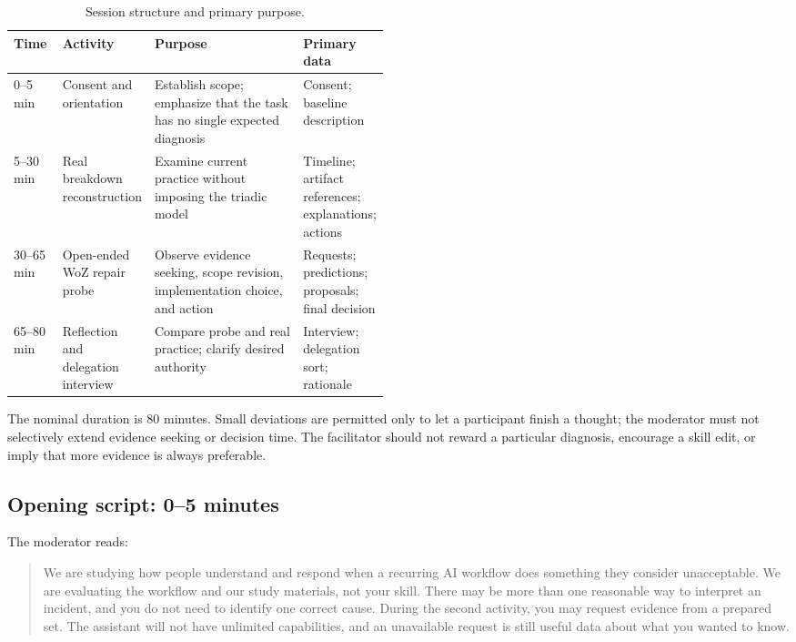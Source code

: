 \begin{table}[h]
\centering
\caption{Session structure and primary purpose.}
\label{tab:session-overview}
\begin{tabularx}{\linewidth}{P{0.13\linewidth}P{0.17\linewidth}Y P{0.18\linewidth}}
\toprule
\textbf{Time} & \textbf{Activity} & \textbf{Purpose} & \textbf{Primary data} \\
--5 min & Consent and orientation & Establish scope; emphasize that the task has no single expected diagnosis & Consent; baseline description \\
5--30 min & Real breakdown reconstruction & Examine current practice without imposing the triadic model & Timeline; artifact references; explanations; actions \\
30--65 min & Open-ended WoZ repair probe & Observe evidence seeking, scope revision, implementation choice, and action & Requests; predictions; proposals; final decision \\
65--80 min & Reflection and delegation interview & Compare probe and real practice; clarify desired authority & Interview; delegation sort; rationale \\
\bottomrule
\end{tabularx}
\end{table}

The nominal duration is 80 minutes. Small deviations are permitted only to let a participant finish a thought; the moderator must not selectively extend evidence seeking or decision time.
The facilitator should not reward a particular diagnosis, encourage a skill
edit, or imply that more evidence is always preferable.

\subsection{Opening script: 0--5 minutes}

The moderator reads:

\begin{quote}
We are studying how people understand and respond when a recurring AI workflow
does something they consider unacceptable. We are evaluating the workflow and
our study materials, not your skill. There may be more than one reasonable way
to interpret an incident, and you do not need to identify one correct cause.
During the second activity, you may request evidence from a prepared set. The
assistant will not have unlimited capabilities, and an unavailable request is
still useful data about what you wanted to know.
\end{quote}

